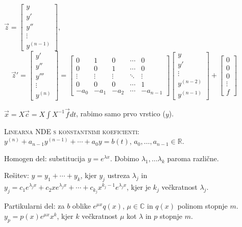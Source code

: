 \documentclass[8pt,a4paper]{amsart}
\theoremstyle{definition} %
\theoremstyle{plain} %
\let\oldint\int
\renewcommand{\int}{\oldint \!}
\newcommand{\R}{\mathbb R}
\newcommand{\C}{\mathbb C}
\begin{document}
$\vec{z} = \begin{bmatrix} y \\ y' \\ y'' \\ \vdots \\ y^{(n-1)} \end{bmatrix}$,
$ \quad \vec{z}' =  \begin{bmatrix} y' \\ y'' \\ y''' \\ \vdots \\ y^{(n)} \end{bmatrix}
=
\begin{bmatrix}
  0 & 1 & 0 &  \cdots & 0 \\
  0 & 0 & 1 &  \cdots & 0 \\
  \vdots & \vdots & \vdots & \ddots & \vdots \\
  0 & 0 & 0 &  \cdots & 1 \\
  -a_0 & -a_1 & -a_2 & \cdots & -a_{n-1}
\end{bmatrix}
\begin{bmatrix} y \\ y' \\ \vdots \\ y^{(n-2)} \\ y^{(n-1)} \end{bmatrix}
+
\begin{bmatrix} 0 \\ 0 \\ 0 \\ \vdots \\ f \end{bmatrix}$

$\vec{x} = X\vec{c} = X \int X^{-1}\vec{f}dt$, rabimo samo prvo vrstico ($y$).

\textsc{Linearna NDE s konstantnimi koeficienti:}
$y^{(n)}+a_{n-1}y^{(n-1)}+\cdots + a_0y = b(t)$, $a_0,\ldots ,a_{n-1} \in \R$.

Homogen del: substitucija $y = e^{\lambda x}$. Dobimo $\lambda_1, \ldots \lambda_k$ paroma
različne.

\hspace{3em} Rešitev: $y = y_1+\cdots +y_k$, kjer $y_j$ ustreza $\lambda_j$ in $y_j = c_1
e^{\lambda_j x}+c_2 x e^{\lambda_j x}+\cdots + c_{k_j} x^{k_j -1} e^{\lambda_j
x}$, kjer je $k_j$ večkratnost $\lambda_j$.

Partikularni del:
za $b$ oblike $e^{\mu x}q(x)$, $\mu \in \C$ in $q(x)$ polinom stopnje $m$.
$y_p = p(x)e^{\mu x}x^k$, kjer $k$ večkratnost $\mu$ kot $\lambda$ in $p$ stopnje $m$.
\end{document}
